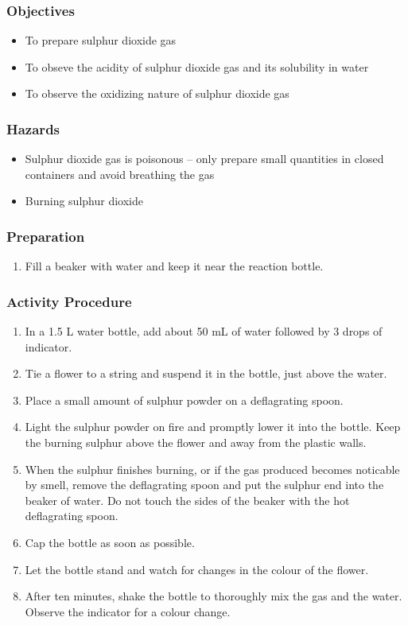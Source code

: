 \subsubsection{Objectives}
\begin{itemize}
\item{To prepare sulphur dioxide gas}
\item{To obseve the acidity of sulphur dioxide gas and its solubility in water}
\item{To observe the oxidizing nature of sulphur dioxide gas}
\end{itemize}

\subsubsection{Hazards}
\begin{itemize}
\item{Sulphur dioxide gas is poisonous -- only prepare small quantities in closed containers and avoid breathing the gas}
\item{Burning sulphur dioxide}
\end{itemize}

\subsubsection{Preparation}
\begin{enumerate}
\item{Fill a beaker with water and keep it near the reaction bottle.}
\end{enumerate}

\subsubsection{Activity Procedure}
\begin{enumerate}
\item{In a 1.5 L water bottle, add about 50 mL of water followed by 3 drops of indicator.}
\item{Tie a flower to a string and suspend it in the bottle, just above the water.}
\item{Place a small amount of sulphur powder on a deflagrating spoon.}
\item{Light the sulphur powder on fire and promptly lower it into the bottle. Keep the burning sulphur above the flower and away from the plastic walls.}
\item{When the sulphur finishes burning, or if the gas produced becomes noticable by smell, remove the deflagrating spoon and put the sulphur end into the beaker of water. Do not touch the sides of the beaker with the hot deflagrating spoon.}
\item{Cap the bottle as soon as possible.}
\item{Let the bottle stand and watch for changes in the colour of the flower.}
\item{After ten minutes, shake the bottle to thoroughly mix the gas and the water. Observe the indicator for a colour change.}
\end{enumerate}

